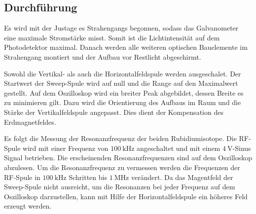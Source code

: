 \subsection{Durchführung}
Es wird mit der Justage es Strahengangs begonnen, sodass das 
Galvanometer eine maximale Stromstärke misst. Somit ist die 
Lichtintensität auf dem Photodetektor maximal. Danach werden 
alle weiteren optischen Bauelemente im Strahengang montiert und der 
Aufbau vor Restlicht abgeschirmt.

\noindent
Sowohl die Vertikal- als auch die Horizontalfeldspule werden 
ausgeschalet. Der Startwert der Sweep-Spule wird auf null und die 
Range auf den Maximalwert gestellt. Auf dem Oszilloskop wird ein 
breiter Peak abgebildet, dessen Breite es zu minimieren gilt. Dazu 
wird die Orientierung des Aufbaus im Raum und die Stärke der 
Vertikalfeldspule angepasst. Dies dient der Kompensation des 
Erdmagnetfeldes. 

\noindent
Es folgt die Messung der Resonanzfrequenz der beiden Rubidiumisotope.
Die RF-Spule wird mit einer Frequenz von $\SI{100}{\kilo\hertz}$
angeschaltet und mit einem $\SI{4}{\volt}$-Sinus Signal betrieben. 
Die erscheinenden Resonanzfrequenzen sind auf dem Oszilloskop abzulesen. 
Um die Resonanzfrequenz zu vermessen werden die Frequenzen der RF-Spule
in $\SI{100}{\kilo\hertz}$ Schritten bis $\SI{1}{\mega\hertz}$ verändert.
Da das Magentfeld der Sweep-Spule nicht ausreicht, um die Resonanzen
bei jeder Frequenz auf dem Oszilloskop darzustellen, kann mit Hilfe 
der Horizontalfeldspule ein höheres Feld erzeugt werden.
